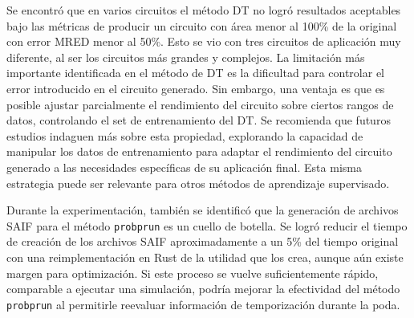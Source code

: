 %

Se encontró que en varios circuitos el método DT no logró resultados aceptables
bajo las métricas de producir un circuito con área menor al 100\% de la
original con error MRED menor al 50\%. Esto se vio con tres circuitos de
aplicación muy diferente, al ser los circuitos más grandes y complejos.
La limitación más importante identificada en el método de DT es la dificultad
para controlar el error introducido en el circuito generado.
Sin embargo, una ventaja es que es posible ajustar parcialmente el rendimiento
del circuito sobre ciertos rangos de datos, controlando el set de entrenamiento
del DT.
Se recomienda que futuros estudios indaguen más sobre esta propiedad,
explorando la capacidad de manipular los datos de entrenamiento para adaptar el
rendimiento del circuito generado a las necesidades específicas de su
aplicación final.
Esta misma estrategia puede ser relevante para otros métodos de aprendizaje
supervisado.

Durante la experimentación, también se identificó que la generación de archivos
SAIF para el método \texttt{probprun} es un cuello de botella.
Se logró reducir el tiempo de creación de los archivos SAIF aproximadamente a
un 5\% del tiempo original con una reimplementación en Rust de la utilidad que
los crea, aunque aún existe margen para optimización.
Si este proceso se vuelve suficientemente rápido, comparable a ejecutar una
simulación, podría mejorar la efectividad del método \texttt{probprun} al
permitirle reevaluar información de temporización durante la poda.

